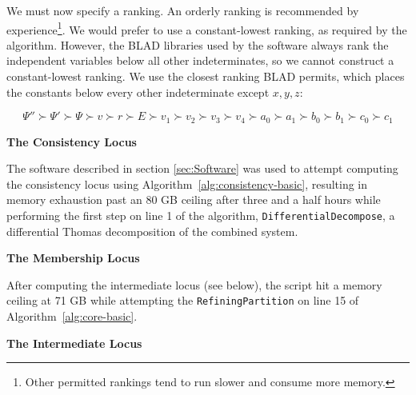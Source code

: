 \documentclass{article}
\theoremstyle{definition}
\theoremstyle{plain}
\begin{document}

We must now specify a ranking.
An orderly ranking is recommended by experience\footnote{Other permitted rankings tend to run slower and consume more memory.}.
We would prefer to use a constant-lowest ranking, as required by the algorithm.
However, the BLAD libraries used by the software always rank the independent variables below all other indeterminates,
so we cannot construct a constant-lowest ranking.  We use
the closest ranking BLAD permits, which places the constants below every other indeterminate except $x,y,z$:

\begin{equation}
\label{ranking}
\Psi'' \succ \Psi' \succ \Psi \succ v \succ r \succ E \succ v_1 \succ v_2 \succ v_3 \succ v_4 \succ a_0 \succ a_1 \succ b_0 \succ b_1 \succ c_0 \succ c_1
\end{equation}

{\bf The Consistency Locus}

The software described in section \ref{sec:Software} was used to attempt computing the consistency locus
using Algorithm~\ref{alg:consistency-basic}, resulting in memory exhaustion past an 80 GB ceiling after three and a half hours
while performing the first step on line 1 of the algorithm, {\tt DifferentialDecompose}, a differential Thomas decomposition of the combined system.

{\bf The Membership Locus}

After computing the intermediate locus (see below), the script hit a memory ceiling at 71 GB while
attempting the {\tt RefiningPartition} on line 15 of Algorithm~\ref{alg:core-basic}.

{\bf The Intermediate Locus}
\end{document}

